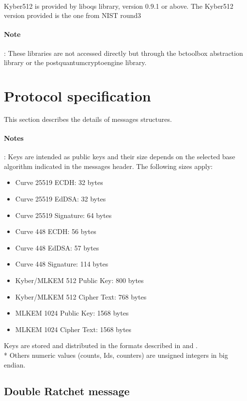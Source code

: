 \documentclass[a4paper,11pt]{article}
\begin{document}
    \paragraph{}Kyber512 is provided by liboqs library\cite{liboqs}, version 0.9.1 or above. The Kyber512 version provided is the one from NIST round3
    \paragraph{Note}: These libraries are not accessed directly but through the bctoolbox abstraction library or the postquantumcryptoengine library.

\newpage
\section{Protocol specification}
  This section describes the details of messages structures.
  \paragraph*{Notes}: Keys are intended as public keys and their size depends on the selected base algorithm indicated in the messages header. The following sizes apply:
  \begin{itemize}
    \item Curve 25519 ECDH: 32 bytes
    \item Curve 25519 EdDSA: 32 bytes
    \item Curve 25519 Signature: 64 bytes
    \item Curve 448 ECDH: 56 bytes
    \item Curve 448 EdDSA: 57 bytes
    \item Curve 448 Signature: 114 bytes
    \item Kyber/MLKEM 512 Public Key: 800 bytes
    \item Kyber/MLKEM 512 Cipher Text: 768 bytes
    \item MLKEM 1024 Public Key: 1568 bytes
    \item MLKEM 1024 Cipher Text: 1568 bytes

  \end{itemize}
  Keys are stored and distributed in the formats described in \cite{rfc7748} and \cite{rfc8032}.\\*
  Others numeric values (counts, Ids, counters) are unsigned integers in big endian.

  \subsection{Double Ratchet message}
\end{document}
